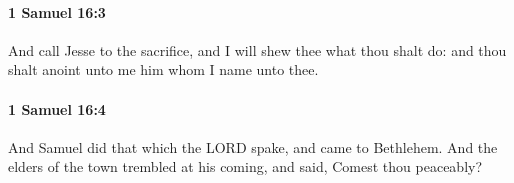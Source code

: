 		\paragraph{1 Samuel 16:3} %
			\label{1SAMUEL-16-3}

			And call Jesse to the sacrifice, and I will shew thee what thou shalt do: and thou shalt anoint unto me him whom I name unto thee.


		\paragraph{1 Samuel 16:4} %
			\label{1SAMUEL-16-4}

			And Samuel did that which the LORD spake, and came to Bethlehem. And the elders of the town trembled at his coming, and said, Comest thou peaceably?


